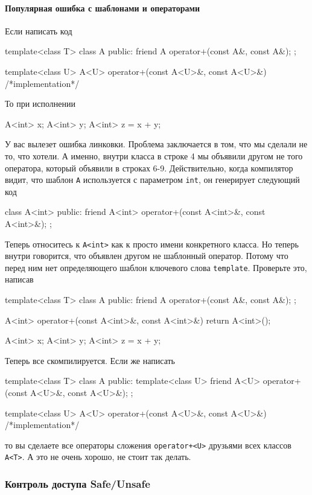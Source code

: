 \paragraph{Популярная ошибка с шаблонами и операторами}
Если написать код
\begin{cppcode}
template<class T>
class A {
public:
  friend A operator+(const A&, const A&);
};

template<class U>
A<U> operator+(const A<U>&, const A<U>&) {
  /*implementation*/
}
\end{cppcode}
То при исполнении
\begin{cppcode}
A<int> x;
A<int> y;
A<int> z = x + y;
\end{cppcode}
У вас вылезет ошибка линковки.
Проблема заключается в том, что мы сделали не то, что хотели.
А именно, внутри класса в строке 4 мы объявили другом не того оператора, который объявили в строках 6-9.
Действительно, когда компилятор видит, что шаблон \verb"A" используется с параметром \verb"int", он генерирует следующий код
\begin{cppcode}
class A<int> {
public:
  friend A<int> operator+(const A<int>&, const A<int>&);
};
\end{cppcode}
Теперь относитесь к \verb"A<int>" как к просто имени конкретного класса.
Но теперь внутри говорится, что объявлен другом не шаблонный оператор.
Потому что перед ним нет определяющего шаблон ключевого слова \verb"template".
Проверьте это, написав
\begin{cppcode}
template<class T>
class A {
public:
  friend A operator+(const A&, const A&);
};

A<int> operator+(const A<int>&, const A<int>&) {
  return A<int>();
}

A<int> x;
A<int> y;
A<int> z = x + y;
\end{cppcode}
Теперь все скомпилируется.
Если же написать
\begin{cppcode}
template<class T>
class A {
public:
  template<class U>
  friend A<U> operator+(const A<U>&, const A<U>&);
};

template<class U>
A<U> operator+(const A<U>&, const A<U>&) {
  /*implementation*/
}
\end{cppcode}
то вы сделаете все операторы сложения \verb"operator+<U>" друзьями всех классов \verb"A<T>".
А это не очень хорошо, не стоит так делать.

\subsubsection{Контроль доступа Safe/Unsafe}

